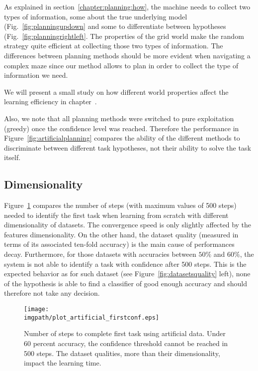 As explained in section~\ref{chapter:planning:how}, the machine needs to collect two types of information, some about the true underlying model (Fig.~\ref{fig:planningupdown} and some to differentiate between hypotheses (Fig.~\ref{fig:planningrightleft}. The properties of the grid world make the random strategy quite efficient at collecting those two types of information. The differences between planning methods should be more evident when navigating a complex maze since our method allows to plan in order to collect the type of information we need. 

We will present a small study on how different world properties affect the learning efficiency in chapter~. 

Also, we note that all planning methods were switched to pure exploitation (greedy) once the confidence level was reached. Therefore the performance in Figure~\ref{fig:artificialplanning} compares the ability of the different methods to discriminate between different task hypotheses, not their ability to solve the task itself.

\subsection{Dimensionality}

Figure~\ref{fig:firstArtificial} compares the number of steps (with maximum values of 500 steps) needed to identify the first task when learning from scratch with different dimensionality of datasets. The convergence speed is only slightly affected by the features dimensionality. On the other hand, the dataset quality (measured in terms of its associated ten-fold accuracy) is the main cause of performances decay. Furthermore, for those datasets with accuracies between $50\%$ and $60\%$, the system is not able to identify a task with confidence after 500 steps. This is the expected behavior as for such dataset (see Figure~\ref{fig:datasetsquality} left), none of the hypothesis is able to find a classifier of good enough accuracy and should therefore not take any decision.

\begin{figure}[!ht]
  \centering
      \texttt{[image: \\imgpath/plot\_artificial\_firstconf.eps]}
      \caption{Number of steps to complete first task using artificial data. Under 60 percent accuracy, the confidence threshold cannot be reached in 500 steps. The dataset qualities, more than their dimensionality, impact the learning time.}
      \label{fig:firstArtificial}
\end{figure} 

